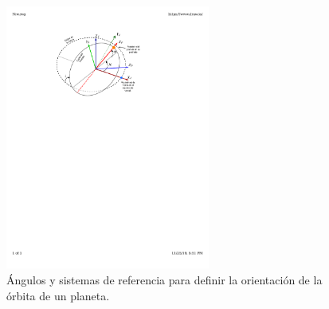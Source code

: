 \documentclass[a4paper,10pt]{article}
\begin{document}
\begin{figure}
  \centering
  \includegraphics[width=0.6\textwidth]{Figures/Niw.pdf}
  \caption{Ángulos y sistemas de referencia para definir la orientación de la órbita de un planeta.}
  \label{fig:Niw}
\end{figure}
\end{document}
